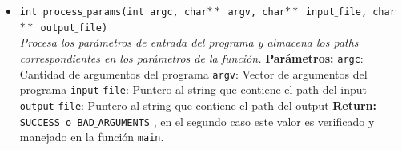 \documentclass[a4paper, 10pt]{article}
\def\code#1{\texttt{#1}}
\begin{document}
\begin{itemize}
				\item \code{int process$\_$params(int argc, char$**$ argv,
				char$**$ input$\_$file, char$**$ output$\_$file)}
				\\\textit{Procesa los parámetros de entrada del programa y almacena
				los paths correspondientes en los parámetros de la función.}
					\subitem \textbf{Parámetros:}
						\subsubitem \code{argc}: Cantidad de argumentos del programa
						\subsubitem \code{argv}: Vector de argumentos del programa
						\subsubitem \code{input$\_$file}: Puntero al string que contiene el path
						del input
						\subsubitem \code{output$\_$file}: Puntero al string que contiene el path
						del output
					\subitem \textbf{Return:}
						\subsubitem \code{SUCCESS o BAD$\_$ARGUMENTS} , en el segundo caso este valor
						es verificado y manejado en la función \code{main}.
						
			\end{itemize}
			
\end{document}
